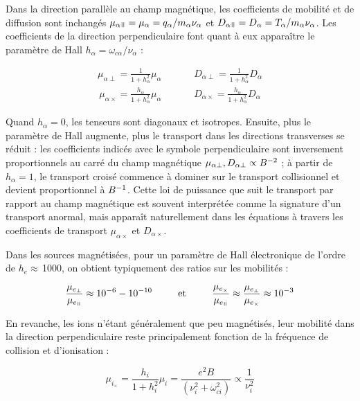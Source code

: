 \begin{refsection}
Dans la direction parallèle au champ magnétique, les coefficients de mobilité et
de diffusion sont inchangés
$\mu_{\alpha\para}=\mu_{\alpha}=q_\alpha/m_\alpha\nu_\alpha$ et
$D_{\alpha\para}=D_\alpha=T_\alpha/m_\alpha\nu_\alpha$. Les coefficients de la
direction perpendiculaire font quant à eux apparaître le paramètre de Hall
$h_\alpha=\omega_{c\alpha}/\nu_\alpha$ :

\begin{align}
\mu_{\alpha\perp}=\frac{1}{1+h_\alpha^2}\mu_\alpha\;\;\;\;\;\;\;\;
\;\;\;\;D_{\alpha\perp}=\frac{1}{1+h_\alpha^2}D_\alpha
\end{align}
\begin{align}
\mu_{\alpha\times}=\frac{h_\alpha}{1+h_\alpha^2}\mu_\alpha\;\;\;\;
\;\;\;\;\;\;\;\;D_{\alpha\times}=\frac{h_\alpha}{1+h_\alpha^2}D_\alpha
\end{align}

Quand $h_\alpha=0$, les tenseurs sont diagonaux et isotropes. Ensuite, plus le
paramètre de Hall augmente, plus le transport dans les directions transverses se
réduit :
les coefficients indicés avec le symbole perpendiculaire sont inversement
proportionnels au carré du champ magnétique $\mu_{\alpha\perp},
D_{\alpha\perp}\propto B^{{-2}}$ ; à partir de $h_\alpha=1$, le
transport croisé commence à dominer sur le transport collisionnel et devient proportionnel à
$B^{{-1}}$. Cette loi de puissance que suit le transport par rapport au
champ magnétique est souvent interprétée comme la signature d'un transport
anormal, mais apparaît naturellement dans les équations à travers les
coefficients de transport $\mu_{\alpha\times}$ et $D_{\alpha\times}$.

Dans les sources magnétisées, pour un paramètre de Hall électronique de l'ordre
de $h_e\approx\,$1000, on obtient typiquement des ratios sur les mobilités :

\begin{equation}
\frac{\mu_{e_\perp}}{\mu_{e_\para}}\approx
10^{-6}-10^{-10}\text{~~~~~~~~et~~~~~~~~}\frac{\mu_{e_\times}}{\mu_{e_\para}}\approx
\frac{\mu_{e_\perp}}{\mu_{e_\times}}\approx10^{-3}
\end{equation}

En revanche, les ions n'étant généralement que peu magnétisés, leur mobilité
dans la direction perpendiculaire reste principalement fonction de la fréquence
de collision et d'ionisation  :

\begin{equation}
\mu_{i_\times}=\frac{h_i}{1+h_i^2}\mu_i=\frac{e^2B}{(\nu_i^2+\omega_{ci}^2)}\propto\frac{1}{\nu_i^2}
\end{equation}


\end{refsection}
